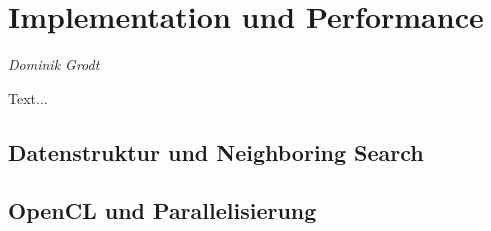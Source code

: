 \section{Implementation und Performance}


\begin{center}
\emph{{\small Dominik Grodt}}
\end{center}

\bigskip

Text...

\subsection{Datenstruktur und Neighboring Search}
\subsection{OpenCL und Parallelisierung}

